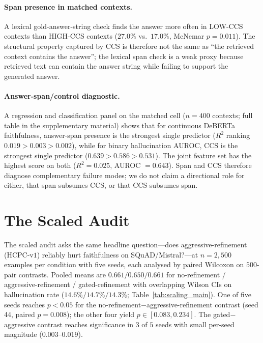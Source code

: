 \paragraph{Span presence in matched contexts.} A lexical
gold-answer-string check finds the answer more often in LOW-CCS
contexts than HIGH-CCS contexts ($27.0\%$ vs.\ $17.0\%$, McNemar
$p=0.011$). The structural property captured by CCS is therefore not
the same as ``the retrieved context contains the answer''; the
lexical span check is a weak proxy because retrieved text can contain
the answer string while failing to support the generated answer.

\paragraph{Answer-span/control diagnostic.} A regression and
classification panel on the matched cell ($n=400$ contexts; full table
in the supplementary material) shows that for continuous DeBERTa faithfulness,
answer-span presence is the strongest single predictor ($R^2$ ranking
$0.019 > 0.003 > 0.002$), while for binary hallucination AUROC, CCS is
the strongest single predictor ($0.639 > 0.586 > 0.531$). The joint
feature set has the highest score on both ($R^2 = 0.025$, AUROC
$= 0.643$). Span and CCS therefore diagnose complementary failure
modes; we do not claim a directional role for either, that span
subsumes CCS, or that CCS subsumes span.

\section{The Scaled Audit}
\label{sec:scaling}

The scaled audit asks the same headline question---does
aggressive-refinement (HCPC-v$1$) reliably hurt faithfulness on
SQuAD/Mistral?---at $n=2{,}500$ examples per condition with five
seeds, each analysed by paired Wilcoxon on $500$-pair contrasts.
Pooled means are $0.661 / 0.650 / 0.661$ for no-refinement /
aggressive-refinement / gated-refinement with overlapping Wilson CIs
on hallucination rate ($14.6\% / 14.7\% / 14.3\%$;
Table~\ref{tab:scaling_main}). One of five seeds reaches $p<0.05$
for the no-refinement$-$aggressive-refinement contrast (seed 44,
paired $p=0.008$); the other four yield $p \in [0.083, 0.234]$. The
gated$-$aggressive contrast reaches significance in $3$ of $5$ seeds
with small per-seed magnitude ($0.003$--$0.019$).

